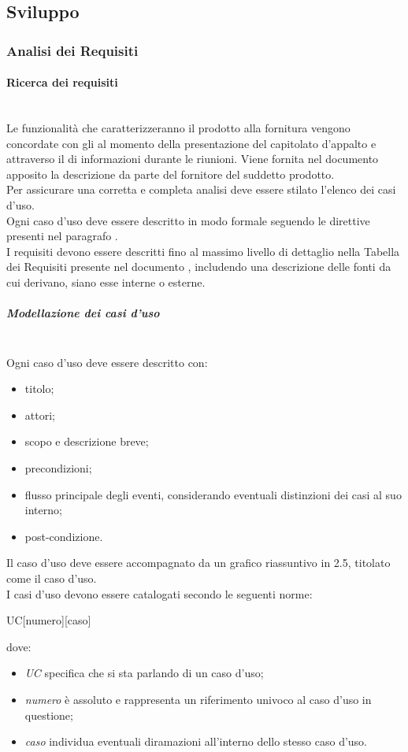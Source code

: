 \subsection{Sviluppo}

\subsubsection{Analisi dei Requisiti}
\paragraph{Ricerca dei requisiti}\mbox{}\\
Le funzionalità che caratterizzeranno il prodotto alla fornitura vengono concordate con gli  al momento della presentazione del capitolato d'appalto e attraverso il  di informazioni durante le riunioni. Viene fornita nel documento apposito \AnalisiDeiRequisiti{} la descrizione da parte del fornitore del suddetto prodotto.\\
Per assicurare una corretta e completa analisi deve essere stilato l'elenco dei casi d'uso.\\
Ogni caso d'uso deve essere descritto in modo formale seguendo le direttive presenti nel paragrafo .\\
I requisiti devono essere descritti fino al massimo livello di dettaglio nella Tabella dei Requisiti presente nel documento \AnalisiDeiRequisiti, includendo una descrizione delle fonti da cui derivano, siano esse interne o esterne.

\subparagraph{Modellazione dei casi d'uso}\mbox{}\label{modellazione-casi-uso}\\
Ogni caso d'uso deve essere descritto con:
\begin{itemize}
	\item titolo;
	\item attori;
	\item scopo e descrizione breve;
	\item precondizioni;
	\item flusso principale degli eventi, considerando eventuali distinzioni dei casi al suo interno;
	\item post-condizione.
\end{itemize}
Il caso d'uso deve essere accompagnato da un grafico riassuntivo in  2.5, titolato come il caso d'uso.\\
I casi d'uso devono essere catalogati secondo le seguenti norme:
\begin{center}
	UC[numero][caso]
\end{center}
dove:
\begin{itemize}
	\item \textit{UC} specifica che si sta parlando di un caso d'uso;
	\item \textit{numero} è assoluto e rappresenta un riferimento univoco al caso d'uso in questione;
	\item \textit{caso} individua eventuali diramazioni all'interno dello stesso caso d’uso.
\end{itemize}

